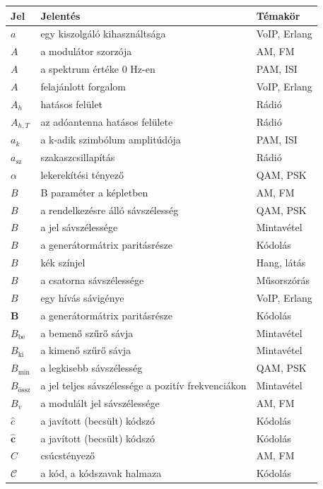 {\small\renewcommand{\arraystretch}{1.2}\begin{longtable}{@{}>{\raggedright\arraybackslash}p{2.4cm}>{\raggedright\arraybackslash}p{8.2cm}>{\raggedright\arraybackslash}p{3.8cm}@{}}\toprule
\textbf{Jel} & \textbf{Jelentés} & \textbf{Témakör}\\\midrule\endhead
$a$ & egy kiszolgáló kihasználtsága & VoIP, Erlang\\
$A$ & a modulátor szorzója & AM, FM\\
$A$ & a spektrum értéke 0 Hz-en & PAM, ISI\\
$A$ & felajánlott forgalom & VoIP, Erlang\\
$A_h$ & hatásos felület & Rádió\\
$A_{h,T}$ & az adóantenna hatásos felülete & Rádió\\
$a_k$ & a k-adik szimbólum amplitúdója & PAM, ISI\\
$a_\mathrm{sz}$ & szakaszcsillapítás & Rádió\\
$\alpha$ & lekerekítési tényező & QAM, PSK\\
$B$ & B paraméter a képletben & AM, FM\\
$B$ & a rendelkezésre álló sávszélesség & QAM, PSK\\
$B$ & a jel sávszélessége & Mintavétel\\
$B$ & a generátormátrix paritásrésze & Kódolás\\
$B$ & kék színjel & Hang, látás\\
$B$ & a csatorna sávszélessége & Műsorszórás\\
$B$ & egy hívás sávigénye & VoIP, Erlang\\
$\mathbf B$ & a generátormátrix paritásrésze & Kódolás\\
$B_\text{be}$ & a bemenő szűrő sávja & Mintavétel\\
$B_\text{ki}$ & a kimenő szűrő sávja & Mintavétel\\
$B_{\min}$ & a legkisebb sávszélesség & QAM, PSK\\
$B_\text{össz}$ & a jel teljes sávszélessége a pozitív frekvenciákon & Mintavétel\\
$B_v$ & a modulált jel sávszélessége & AM, FM\\
$\hat c$ & a javított (becsült) kódszó & Kódolás\\
$\hat{\mathbf c}$ & a javított (becsült) kódszó & Kódolás\\
$C$ & csúcstényező & AM, FM\\
$\mathcal C$ & a kód, a kódszavak halmaza & Kódolás\\

\end{longtable}}
